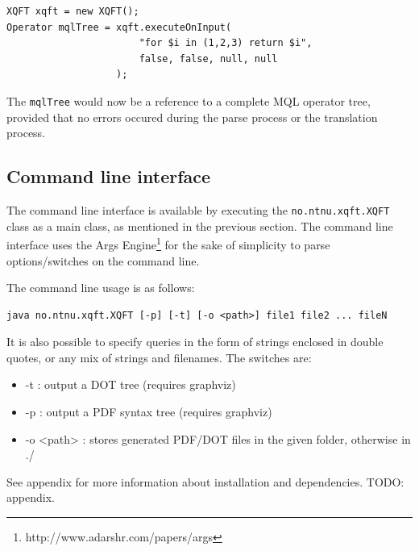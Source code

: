 \begin{Verbatim}
XQFT xqft = new XQFT();
Operator mqlTree = xqft.executeOnInput(
                       "for $i in (1,2,3) return $i", 
                       false, false, null, null
                   );
\end{Verbatim}

The \texttt{mqlTree} would now be a reference to a complete MQL operator tree,
provided that no errors occured during the parse process or the translation
process.

\subsection{Command line interface}
The command line interface is available by executing the
\texttt{no.ntnu.xqft.XQFT} class as a main class, as mentioned in the previous
section. The command line interface uses the Args
Engine\footnote{http://www.adarshr.com/papers/args} for the sake of simplicity
to parse options/switches on the command line. 

The command line usage is as follows:

\begin{Verbatim}
java no.ntnu.xqft.XQFT [-p] [-t] [-o <path>] file1 file2 ... fileN
\end{Verbatim}

It is also possible to specify queries in the form of strings enclosed in
double quotes, or any mix of strings and filenames. The switches are:
\begin{itemize}
  \item -t : output a DOT tree (requires graphviz)
  \item -p : output a PDF syntax tree (requires graphviz)
  \item -o <path> : stores generated PDF/DOT files in the given folder, 
  otherwise in ./
\end{itemize}

See appendix for more information about installation and dependencies.
TODO: appendix.
